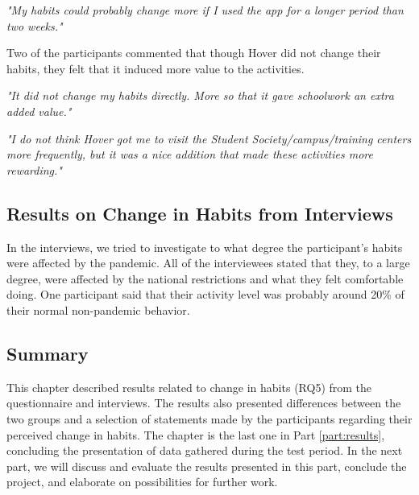 \textit{"My habits could probably change more if I used the app for a longer period than two weeks." \footnotemark[\value{footnote}]}

Two of the participants commented that though Hover did not change their habits, they felt that it induced more value to the activities.

\textit{"It did not change my habits directly. More so that it gave schoolwork an extra added value." \footnotemark[\value{footnote}]}

\textit{"I do not think Hover got me to visit the Student Society/campus/training centers more frequently, but it was a nice addition that made these activities more rewarding." \footnotemark[\value{footnote}]}


\subsection{Results on Change in Habits from Interviews}
In the interviews, we tried to investigate to what degree the participant’s habits were affected by the pandemic. All of the interviewees stated that they, to a large degree, were affected by the national restrictions and what they felt comfortable doing. One participant said that their activity level was probably around 20\% of their normal non-pandemic behavior. 

\subsection{Summary}
This chapter described results related to change in habits (RQ5) from the questionnaire and interviews. The results also presented differences between the two groups and a selection of statements made by the participants regarding their perceived change in habits. The chapter is the last one in Part \ref{part:results}, concluding the presentation of data gathered during the test period. In the next part, we will discuss and evaluate the results presented in this part, conclude the project, and elaborate on possibilities for further work.